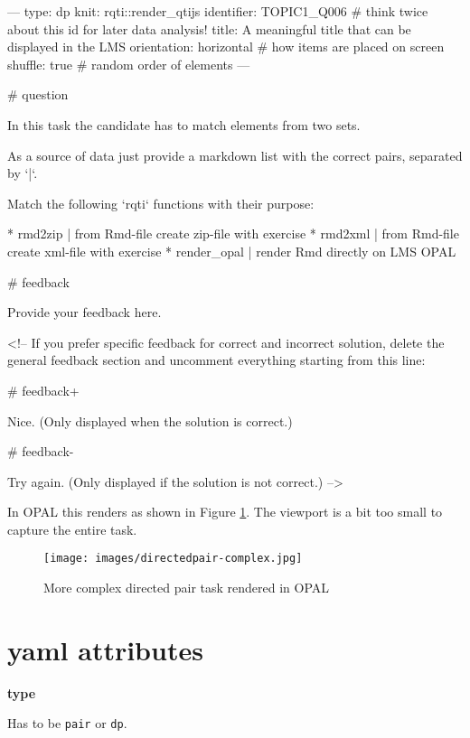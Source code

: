 \documentclass[twoside]{tufte-book}
\newenvironment{Shaded}{}{}
\begin{document}
\begin{Shaded}
\begin{Highlighting}
---
type: dp
knit: rqti::render_qtijs
identifier: TOPIC1_Q006 # think twice about this id for later data analysis!
title: A meaningful title that can be displayed in the LMS
orientation: horizontal # how items are placed on screen
shuffle: true # random order of elements
---

# question

In this task the candidate has to match elements from two sets.

As a source of data just provide a markdown list with the correct pairs,
separated by `|`.

Match the following `rqti` functions with their purpose:

* rmd2zip | from Rmd-file create zip-file with exercise
* rmd2xml | from Rmd-file create xml-file with exercise
* render_opal | render Rmd directly on LMS OPAL


# feedback

Provide your feedback here.

<!-- If you prefer specific feedback for correct and incorrect solution, delete
the general feedback section and uncomment everything starting from this line:

# feedback+

Nice. (Only displayed when the solution is correct.)

# feedback-

Try again. (Only displayed if the solution is not correct.)
-->
\end{Highlighting}
\end{Shaded}

In OPAL this renders as shown in Figure \ref{dp2opal}. The viewport is a bit too small to capture the entire task.

\begin{figure}
\centering
\texttt{[image: images/directedpair-complex.jpg]}
\caption{\label{dp2opal}More complex directed pair task rendered in OPAL}
\end{figure}

\section{yaml attributes}\label{yaml-attributes-6}

\noindent\textbf{type}\label{type-6}

Has to be \texttt{pair} or \texttt{dp}.
\end{document}
